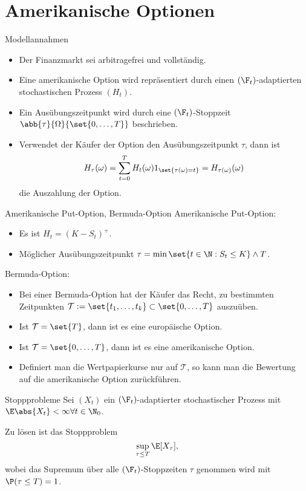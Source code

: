 \section{Amerikanische Optionen}

\begin{karte}{Modellannahmen}
\begin{itemize}
    \item Der Finanzmarkt sei arbitragefrei und vollständig. 
    \item Eine amerikanische Option wird repräsentiert durch einen \((\F_t)\)-adaptierten 
    stochastischen Prozess \((H_t)\).
    \item Ein Ausübungszeitpunkt wird durch eine \((\F_t)\)-Stoppzeit 
    \(\abb{\tau}{\Omega}{\set{0,\ldots, T}}\) beschrieben. 
    \item Verwendet der Käufer der Option den Ausübungszeitpunkt \(\tau\), dann ist 
    \[ H_\tau(\omega) = \sum_{t=0}^T H_t(\omega) 1_{\set{\tau(\omega) = t}} = H_{\tau(\omega)}(\omega) \]
    die Auszahlung der Option.
\end{itemize}
\end{karte}

\begin{karte}{Amerikanische Put-Option, Bermuda-Option}
Amerikanische Put-Option:
\begin{itemize}
    \item Es ist \(H_t = (K - S_t)^+\). 
    \item Möglicher Ausübungszeitpunkt \(\tau = \min \set{t \in \N: S_t \leq K} \wedge T\).
\end{itemize}

Bermuda-Option:
\begin{itemize}
    \item Bei einer Bermuda-Option hat der Käufer das Recht, zu bestimmten Zeitpunkten 
    \(\mathcal{T} := \set{t_1, \ldots, t_k} \subset \set{0, \ldots, T}\) auszuüben.
    \item Ist \(\mathcal{T} = \set{T}\), dann ist es eine europäische Option. 
    \item Ist \(\mathcal{T} = \set{0,\ldots, T}\), dann ist es eine amerikanische Option. 
    \item Definiert man die Wertpapierkurse nur auf \(\mathcal{T}\), so kann man die Bewertung auf 
    die amerikanische Option zurückführen.
\end{itemize}
\end{karte}

\begin{karte}{Stoppprobleme}
Sei \((X_t)\) ein \((\F_t)\)-adaptierter stochastischer Prozess mit \(\E \abs{X_t} < \infty \forall t\in\N_0\).

Zu lösen ist das Stoppproblem 
\[ \sup_{\tau \leq T} \E[X_\tau], \]
wobei das Supremum über alle \((\F_t)\)-Stoppzeiten \(\tau\) genommen wird 
mit \(\P(\tau \leq T) = 1\).
\end{karte}

